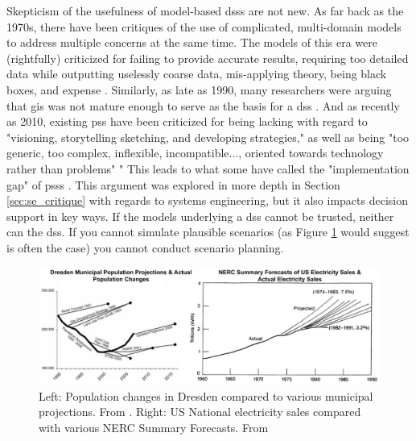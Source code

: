 Skepticism of the usefulness of model-based \acp{dss} are not new. As far back as the 1970s, there have been critiques of the use of complicated, multi-domain models to address multiple concerns at the same time. The models of this era were (rightfully) criticized for failing to provide accurate results, requiring too detailed data while outputting uselessly coarse data, mis-applying theory, being black boxes, and expense \cite{leejrRequiemLargeScaleModels1973}. Similarly, as late as 1990, many researchers were arguing that \ac{gis} was not mature enough to serve as the basis for a \ac{dss} \cite{jankowskiIntegratingGeographicalInformation1995}. And as recently as 2010, existing \ac{pss} have been criticized for being lacking with regard to "visioning, storytelling sketching, and developing strategies," as well as being "too generic, too complex, inflexible, incompatible..., oriented towards technology rather than problems" \cite{brommelstroetPlanningSupportSystems2010}" This leads to what some have called the "implementation gap" of \acp{pss} \cite{BottlenecksBlockingWidespread}. This argument was explored in more depth in Section \ref{sec:se_critique} with regards to systems engineering, but it also impacts decision support in key ways. If the models underlying a \ac{dss} cannot be trusted, neither can the \ac{dss}. If you cannot simulate plausible scenarios (as Figure \ref{fig:projections} would suggest is often the case) you cannot conduct scenario planning.  

\begin{figure}[h]
	\centering
	\includegraphics[scale=0.32]{Figures/chap2/projections.jpg}
	\caption[Projections compared to actual changes]{Left: Population changes in Dresden compared to various municipal projections. From \cite{wiechmannErrorsExpectedAligning2008}. Right: US National electricity sales compared with various NERC Summary Forecasts. From \cite{nelsonNERCFanRetrospective1985}}
	\label{fig:projections}
\end{figure}

